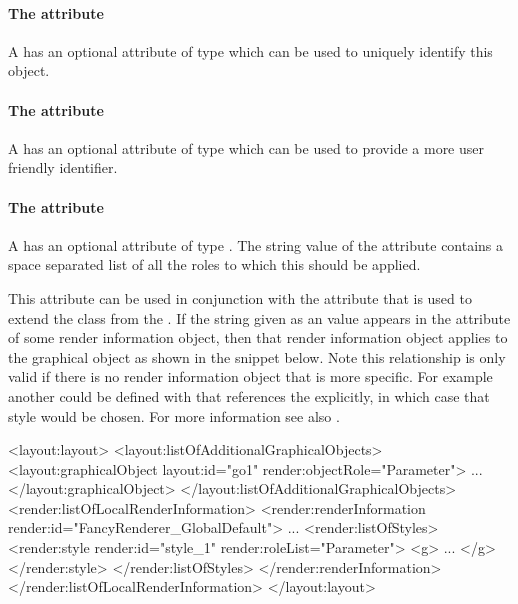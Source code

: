 \paragraph{The \fixttspace{} attribute}

A \Style has an optional attribute  of type  which can be used to uniquely identify this \Style object.

\paragraph{The \fixttspace{} attribute}

A \Style has an optional attribute  of type
 which can be used to provide a more user friendly identifier.

\paragraph{The \fixttspace{} attribute}

A \Style has an optional attribute  of type
. The string value of the  attribute contains 
a space separated list of all the roles to which this \Style should be applied.

This attribute can be  used in conjunction with the  attribute 
that is used to extend the \GraphicalObject class from the \LayoutPackage. If 
the string given as an  value appears in the  
attribute of some render information object, then that render information object
applies to the graphical object as shown in the snippet below. Note this 
relationship is only valid if there is no render information object that is more 
specific. For example another \LocalStyle could be defined with  
that references the  explicitly, in which case that style 
would be  chosen. For more information see also . 

{\footnotesize
\begin{example}
<layout:layout>
   <layout:listOfAdditionalGraphicalObjects>
      <layout:graphicalObject layout:id="go1" render:objectRole="Parameter">
         ...
      </layout:graphicalObject>
   </layout:listOfAdditionalGraphicalObjects>
   <render:listOfLocalRenderInformation>
      <render:renderInformation render:id="FancyRenderer_GlobalDefault">
             ...
        <render:listOfStyles>
             <render:style render:id="style_1" render:roleList="Parameter">
                <g> ... </g>
             </render:style> 
        </render:listOfStyles>
      </render:renderInformation>
   </render:listOfLocalRenderInformation>
</layout:layout>
\end{example}
}


